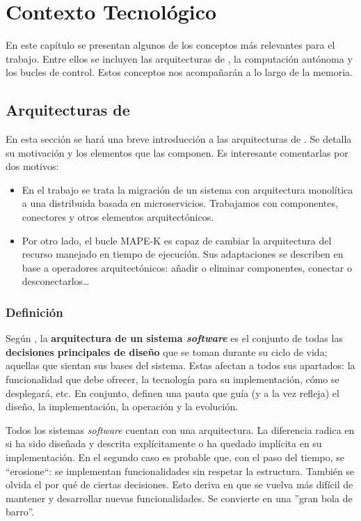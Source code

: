 \chapter{Contexto Tecnológico}
\label{chap:contexto_tecnologico}

En este capítulo se presentan algunos de los conceptos más relevantes para el trabajo. Entre ellos se incluyen las arquitecturas de , la computación autónoma y los bucles de control. Estos conceptos nos acompañarán a lo largo de la memoria.

\section{Arquitecturas de }

En esta sección se hará una breve introducción a las arquitecturas de . Se detalla su motivación y los elementos que las componen. Es interesante comentarlas por dos motivos:

\begin{itemize}
  \item En el trabajo se trata la migración de un sistema con arquitectura monolítica a una distribuida basada en microservicios. Trabajamos con componentes, conectores y otros elementos arquitectónicos.

  \item Por otro lado, el bucle MAPE-K es capaz de cambiar la arquitectura del recurso manejado en tiempo de ejecución. Sus adaptaciones se describen en base a operadores arquitectónicos: añadir o eliminar componentes, conectar o desconectarlos\dots
\end{itemize}

\subsection{Definición}

Según \cite{taylorSoftwareArchitectureFoundations2009}, la \textbf{arquitectura de un sistema \emph{software}} es el conjunto de todas las \textbf{decisiones principales de diseño} que se toman durante su ciclo de vida; aquellas que sientan sus bases del sistema. Estas afectan a todos sus apartados: la funcionalidad que debe ofrecer, la tecnología para su implementación, cómo se desplegará, etc. En conjunto, definen una pauta que guía (y a la vez refleja) el diseño, la implementación, la operación y la evolución.

Todos los sistemas \emph{software} cuentan con una arquitectura. La diferencia radica en si ha sido diseñada y descrita explícitamente o ha quedado implícita en su implementación. \cite{taylorSoftwareArchitectureFoundations2009} En el segundo caso es probable que, con el paso del tiempo, se ``erosione``: se implementan funcionalidades sin respetar la estructura. También se olvida el por qué de ciertas decisiones. Esto deriva en que se vuelva más difícil de mantener y desarrollar nuevas funcionalidades. Se convierte en una ''gran bola de barro''. \cite{footeBigBallMud1997}

